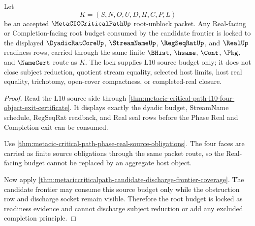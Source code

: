 \begin{theorem}
\label{thm:metaciccriticalpath-real-root-budget-lock}
Let
$$
K=(S,N,O,U,D,H,C,P,L)
$$
be an accepted $\MetaCICCriticalPathUp$ root-unblock packet. Any Real-facing or Completion-facing root budget consumed by the candidate frontier is locked to the displayed $\DyadicRatCoreUp$, $\StreamNameUp$, $\RegSeqRatUp$, and $\RealUp$ readiness rows, carried through the same finite $\BHist$, $\hsame$, $\Cont$, $\Pkg$, and $\NameCert$ route as $K$. The lock supplies L10 source budget only; it does not close subject reduction, quotient stream equality, selected host limits, host real equality, trichotomy, open-cover compactness, or completed-real closure.
\end{theorem}
\begin{proof}
Read the L10 source side through \autoref{thm:metacic-critical-path-l10-four-object-exit-certificate}. It displays exactly the dyadic budget, StreamName schedule, RegSeqRat readback, and Real seal rows before the Phase Real and Completion exit can be consumed.

Use \autoref{thm:metacic-critical-path-phase-real-source-obligations}. The four faces are carried as finite source obligations through the same packet route, so the Real-facing budget cannot be replaced by an aggregate host object.

Now apply \autoref{thm:metaciccriticalpath-candidate-discharge-frontier-coverage}. The candidate frontier may consume this source budget only while the obstruction row and discharge socket remain visible. Therefore the root budget is locked as readiness evidence and cannot discharge subject reduction or add any excluded completion principle.
\end{proof}

